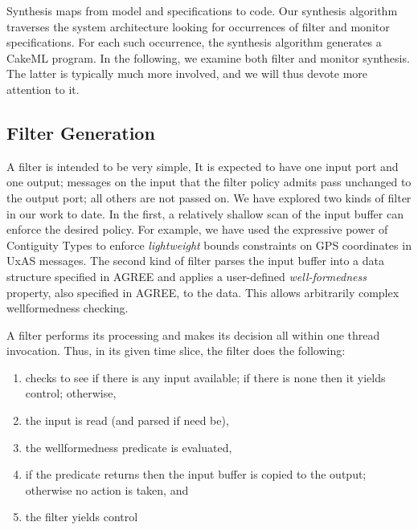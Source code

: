 Synthesis maps from model and specifications to code. Our synthesis algorithm traverses the system architecture looking
for occurrences of filter and monitor specifications. For each such 
occurrence, the synthesis algorithm generates a CakeML program. In the
following, we examine both filter and monitor synthesis. The latter is
typically much more involved, and we will thus devote more attention to it.

\subsection{Filter Generation}

A filter is intended to be very simple,  It is expected to have one
input port and one output; messages on the input that the filter
policy admits pass unchanged to the output port; all others are not
passed on. We have explored two kinds of filter in our work to date. In the
first, a relatively shallow scan of the input buffer can enforce the
desired policy. For example, we have used the expressive power of Contiguity
Types \cite{contiguity-types} to enforce \emph{lightweight} bounds constraints
on GPS coordinates in UxAS messages.  The second
kind of filter parses the input buffer into a data structure
specified in AGREE and applies a user-defined \emph{well-formedness}
property, also specified in AGREE, to the data. This allows
arbitrarily complex wellformedness checking.

A filter performs its processing and makes its decision all within one thread
invocation. Thus, in its given time slice, the filter does the following:

\begin{enumerate}

\item checks to see if there is any input available; if there is none
then it yields control; otherwise,

\item the input is read (and parsed if need be),

\item the wellformedness predicate is evaluated,

\item if the predicate returns  then the input buffer
 is copied to the output; otherwise no action is taken, and

\item the filter yields control
\end{enumerate}

